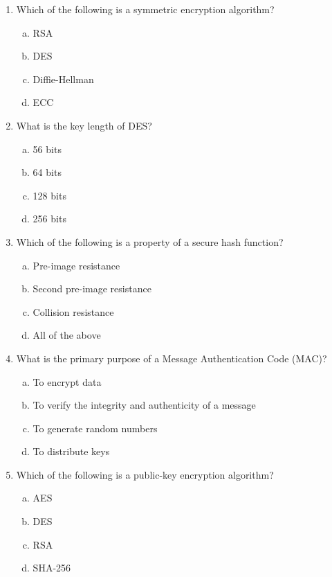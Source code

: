 \documentclass[12pt]{article}
\begin{document}
\begin{enumerate}
    \item Which of the following is a symmetric encryption algorithm?
    \begin{enumerate}[(a)]
        \item RSA
        \item DES
        \item Diffie-Hellman
        \item ECC
    \end{enumerate}

    \item What is the key length of DES?
    \begin{enumerate}[(a)]
        \item 56 bits
        \item 64 bits
        \item 128 bits
        \item 256 bits
    \end{enumerate}

    \item Which of the following is a property of a secure hash function?
    \begin{enumerate}[(a)]
        \item Pre-image resistance
        \item Second pre-image resistance
        \item Collision resistance
        \item All of the above
    \end{enumerate}

    \item What is the primary purpose of a Message Authentication Code (MAC)?
    \begin{enumerate}[(a)]
        \item To encrypt data
        \item To verify the integrity and authenticity of a message
        \item To generate random numbers
        \item To distribute keys
    \end{enumerate}

    \item Which of the following is a public-key encryption algorithm?
    \begin{enumerate}[(a)]
        \item AES
        \item DES
        \item RSA
        \item SHA-256
    \end{enumerate}


\end{enumerate}
\end{document}
